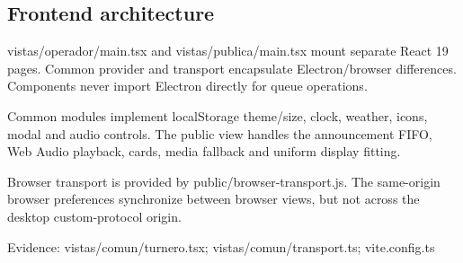 \subsection{Frontend architecture}

vistas/operador/main.tsx and vistas/publica/main.tsx mount separate React 19 pages. Common provider and transport encapsulate Electron/browser differences. Components never import Electron directly for queue operations.

Common modules implement localStorage theme/size, clock, weather, icons, modal and audio controls. The public view handles the announcement FIFO, Web Audio playback, cards, media fallback and uniform display fitting.

Browser transport is provided by public/browser-transport.js. The same-origin browser preferences synchronize between browser views, but not across the desktop custom-protocol origin.

Evidence: vistas/comun/turnero.tsx; vistas/comun/transport.ts; vite.config.ts
